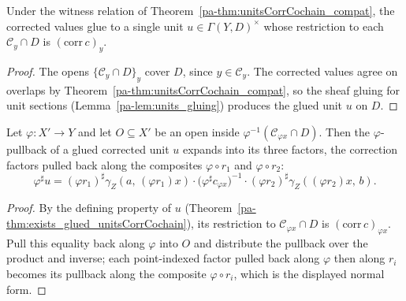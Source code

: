 \begin{theorem}
  \label{pa-thm:exists_glued_unitsCorrCochain}
  \leanok

  Under the witness relation of Theorem~\ref{pa-thm:unitsCorrCochain_compat}, the corrected values
  glue to a single unit \(u \in \Gamma(Y, D)^{\times}\) whose restriction to each
  \(\mathcal C_y \cap D\) is \((\mathrm{corr}\,c)_y\).
\end{theorem}
\begin{proof}
  \leanok
  The opens \(\{\mathcal C_y \cap D\}_{y}\) cover \(D\), since \(y \in \mathcal C_y\). The
  corrected values agree on overlaps by Theorem~\ref{pa-thm:unitsCorrCochain_compat}, so the sheaf
  gluing for unit sections (Lemma~\ref{pa-lem:units_gluing}) produces the glued unit \(u\) on
  \(D\).
\end{proof}

\begin{theorem}
  \label{pa-thm:unitsAppLE_glued_corr}
  \leanok

  Let \(\varphi \colon X' \to Y\) and let \(O \subseteq X'\) be an open inside
  \(\varphi^{-1}(\mathcal C_{\varphi x} \cap D)\). Then the \(\varphi\)-pullback of a glued
  corrected unit \(u\) expands into its three factors, the correction factors pulled back along
  the composites \(\varphi \circ r_1\) and \(\varphi \circ r_2\):
  \[
    \varphi^{\sharp} u =
      (\varphi r_1)^{\sharp}\gamma_Z(a,\, (\varphi r_1)x) \cdot
      \bigl(\varphi^{\sharp} c_{\varphi x}\bigr)^{-1} \cdot
      (\varphi r_2)^{\sharp}\gamma_Z((\varphi r_2)x,\, b) .
  \]
\end{theorem}
\begin{proof}
  \leanok
  By the defining property of \(u\) (Theorem~\ref{pa-thm:exists_glued_unitsCorrCochain}), its
  restriction to \(\mathcal C_{\varphi x} \cap D\) is \((\mathrm{corr}\,c)_{\varphi x}\). Pull
  this equality back along \(\varphi\) into \(O\) and distribute the pullback over the product
  and inverse; each point-indexed factor pulled back along \(\varphi\) then along \(r_i\)
  becomes its pullback along the composite \(\varphi \circ r_i\), which is the displayed normal
  form.
\end{proof}


